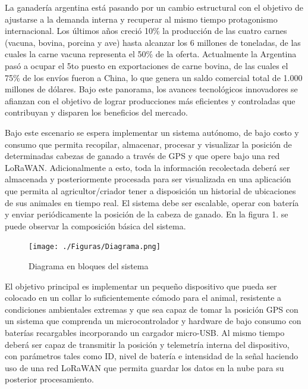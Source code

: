 \documentclass[11pt]{charter}
\begin{document}
La ganadería argentina está pasando por un cambio estructural con el objetivo de ajustarse a la demanda interna y recuperar al mismo tiempo protagonismo internacional. Los últimos años creció 10\% la producción de las cuatro carnes (vacuna, bovina, porcina y ave) hasta alcanzar los 6 millones de toneladas, de las cuales la carne vacuna representa el 50\% de la oferta. Actualmente la Argentina pasó a ocupar el 5to puesto en exportaciones de carne bovina, de las cuales el 75\% de los envíos fueron a China, lo que genera un saldo comercial total de 1.000 millones de dólares. Bajo este panorama, los avances tecnológicos innovadores se afianzan con el objetivo de lograr producciones más eficientes y controladas que contribuyan y disparen los beneficios del mercado. 

Bajo este escenario se espera implementar un sistema autónomo, de bajo costo y consumo que permita recopilar, almacenar, procesar y visualizar la posición de determinadas cabezas de ganado a través de GPS y que opere bajo una red LoRaWAN. Adicionalmente a esto, toda la información recolectada deberá ser almacenada y posteriormente procesada para ser visualizada en una aplicación que permita al agricultor/criador tener a disposición un historial de ubicaciones de sus animales en tiempo real. El sistema debe ser escalable, operar con batería y enviar periódicamente la posición de la cabeza de ganado.  En la figura 1. se puede observar la composición básica del sistema. 



\vspace{25px}

\begin{figure}[htpb]
\centering 
\texttt{[image: ./Figuras/Diagrama.png]}
\caption{Diagrama en bloques del sistema}
\label{fig:diagBloques}
\end{figure}

\vspace{25px}

El objetivo principal es implementar un pequeño dispositivo que pueda ser colocado en un collar lo suficientemente cómodo para el animal, resistente a condiciones ambientales extremas y que sea capaz de tomar la posición GPS con un sistema que comprenda un microcontrolador y hardware de bajo consumo con baterías recargables incorporando un cargador micro-USB. Al mismo tiempo deberá ser capaz de transmitir la posición y telemetría interna del dispositivo, con parámetros tales como ID, nivel de batería e intensidad de la señal haciendo uso de una red LoRaWAN que permita guardar los datos en la nube para su posterior procesamiento. 
\end{document}

